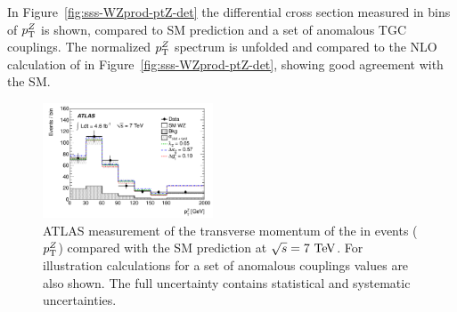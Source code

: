 \begin{table}[htp]
\begin{center}
\caption{Summary of measured fiducial and total $\WZ$ production cross sections from ATLAS 
at 7 TeV centre-of-mass energies in the $\ll\lnu$ final state. The fiducial definitions differ from the 7 and 8 TeV analysis. Further, the 7 TeV analysis
quotes the sum for the $e$ and $\mu$ channels, the 8 TeV analysis quotes the combination of channels. Thus, the two fiducial cross sections cannot be 
compared directly.}
\end{center}
\label{tab:sss-WZprod-xsec}
\end{table}%


In Figure~\ref{fig:sss-WZprod-ptZ-det} the differential cross section measured in bins of 
$p_{\mathrm{T}}^Z$ is shown, compared to SM prediction and a set of anomalous TGC couplings. 
The normalized $p_{\mathrm{T}}^Z$ spectrum is unfolded and compared to the NLO calculation of \mcatnlo in 
Figure~\ref{fig:sss-WZprod-ptZ-det}, showing good agreement with the SM.


\begin{figure}[htbp]
  \begin{center}
  \includegraphics[width=0.45\textwidth]{figures/sss-inclboson-diboson-wzprod-ptZ-det.pdf}
  \caption{ATLAS measurement of the transverse momentum of the \Zboson in \WZ events ($p_{\mathrm{T}}^Z$) compared with the SM prediction at $\rts = 7\TeV$. For illustration calculations for a set of anomalous couplings values are also shown. The full uncertainty contains statistical and systematic uncertainties.}
\label{fig:sss-WZprod-ptZ}
\end{center}
\end{figure}

